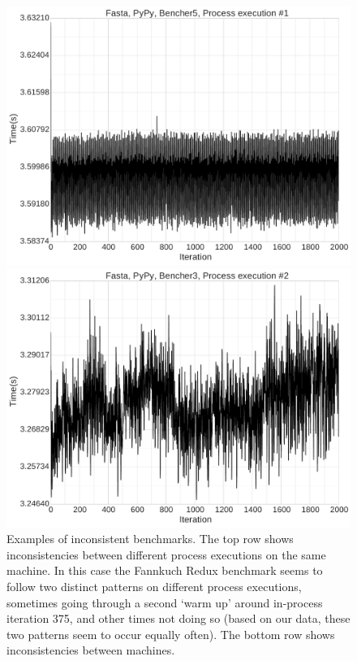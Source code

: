 \documentclass[a4paper,UKenglish]{lipics}
\begin{document}
\begin{figure}[tbp]
{\begin{minipage}{.65\textwidth}
\includegraphics[width=\textwidth]{examples/inconsistent2a.pdf}
\end{minipage}
\begin{minipage}{.65\textwidth}
\includegraphics[width=\textwidth]{examples/inconsistent2b.pdf}
\end{minipage}
}
\caption{Examples of inconsistent benchmarks.
The top row shows inconsistencies between different process
executions on the same machine. In this case the Fannkuch Redux benchmark
seems to follow two distinct patterns on different process executions,
sometimes going through a second `warm up' around in-process iteration 375, and
other times not doing so (based on our data, these two patterns seem to occur
equally often). The bottom row shows inconsistencies between
machines.}
\label{fig:examples:inconsistent}
\end{figure}
\end{document}
